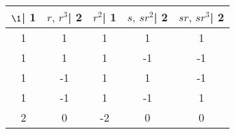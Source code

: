 \begin{tabular}{ccccc}
\toprule
 $\1$| 1 &  $r,\, r^3$| 2 &  $r^2$| 1 &  $s,\, s r^2$| 2 &  $s r,\, s r^3$| 2  \\
\midrule
    1 &           1 &      1 &             1 &                1 \\
    1 &           1 &      1 &            -1 &               -1 \\
    1 &          -1 &      1 &             1 &               -1 \\
    1 &          -1 &      1 &            -1 &                1 \\
    2 &           0 &     -2 &             0 &                0 \\
\bottomrule
\end{tabular}
